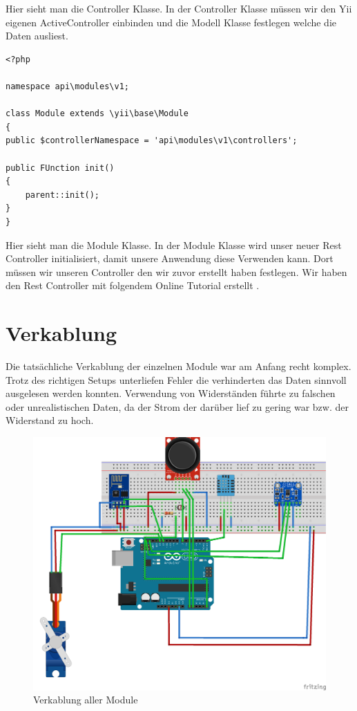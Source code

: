 Hier sieht man die Controller Klasse. In der Controller Klasse müssen wir den Yii eigenen ActiveController einbinden und die Modell Klasse festlegen welche die Daten ausliest.
\begin{lstlisting}[caption=Module Klasse für REST]
<?php

namespace api\modules\v1;

class Module extends \yii\base\Module
{
public $controllerNamespace = 'api\modules\v1\controllers';

public FUnction init()
{
	parent::init();
}
}
\end{lstlisting}
Hier sieht man die Module Klasse. In der Module Klasse wird unser neuer Rest Controller initialisiert, damit unsere Anwendung diese Verwenden kann. Dort müssen wir unseren Controller den wir zuvor erstellt haben festlegen.
\newline
Wir haben den Rest Controller mit folgendem Online Tutorial erstellt \cite{Restt}.



\newpage
\def \currentAuthor {Kevin Glatz}
\section{Verkablung}

Die tatsächliche Verkablung der einzelnen Module war am Anfang recht komplex. Trotz des richtigen Setups unterliefen Fehler die verhinderten das Daten sinnvoll ausgelesen werden konnten. Verwendung von Widerständen führte zu falschen oder unrealistischen Daten, da der Strom der darüber lief zu gering war bzw. der Widerstand zu hoch. 

\begin{figure}[h]
	\centering
	\includegraphics[width=0.7\linewidth]{figures/allMod}
	\caption{Verkablung aller Module}
	\label{fig:allmod}
\end{figure}

